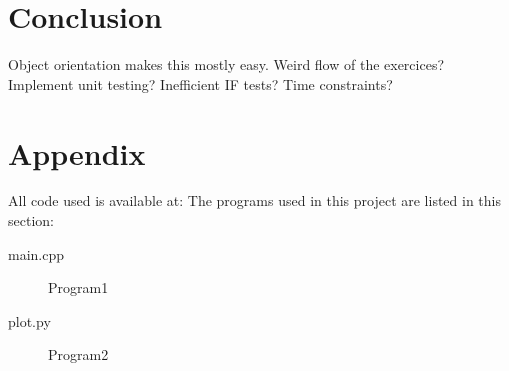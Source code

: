 \documentclass[%
 reprint,
 nobalance,
 amsmath,amssymb,
 aps,
]{revtex4-1}
\begin{document}
\section{Conclusion}
Object orientation makes this mostly easy. Weird flow of the exercices? Implement unit testing? Inefficient IF tests? Time constraints?

\section{Appendix}
All code used is available at: %
The programs used in this project are listed in this section:

\begin{description}
\item [main.cpp] Program1
\item [plot.py] Program2
\end{description}

\end{document}
